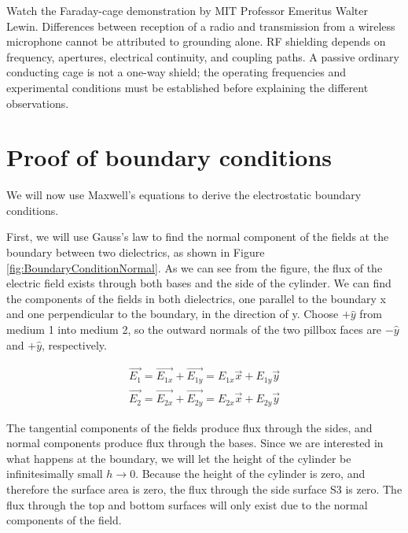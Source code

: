 \documentclass{ximera}
\begin{document}
Watch the Faraday-cage demonstration by MIT Professor Emeritus Walter Lewin. Differences between reception of a radio and transmission from a wireless microphone cannot be attributed to grounding alone. RF shielding depends on frequency, apertures, electrical continuity, and coupling paths. A passive ordinary conducting cage is not a one-way shield; the operating frequencies and experimental conditions must be established before explaining the different observations.


\begin{center}  
\end{center}

\section{Proof of boundary conditions}

We will now use Maxwell's equations to derive the electrostatic boundary conditions. 

First, we will use Gauss's law to find the normal component of the fields at the boundary between two dielectrics, as shown in Figure \ref{fig:BoundaryConditionNormal}. As we can see from the figure, the flux of the electric field exists through both bases and the side of the cylinder. We can find the components of the fields in both dielectrics, one parallel to the boundary x and one perpendicular to the boundary, in the direction of y. Choose $+\hat{y}$ from medium 1 into medium 2, so the outward normals of the two pillbox faces are $-\hat{y}$ and $+\hat{y}$, respectively.

\begin{eqnarray}
\vec{E_1}= \vec{E_{1x}}+\vec{E_{1y}}= E_{1x} \vec{x}+E_{1y} \vec{y} \\
\vec{E_2}= \vec{E_{2x}}+\vec{E_{2y}}= E_{2x} \vec{x}+E_{2y} \vec{y}
\end{eqnarray}


The tangential components of the fields produce flux through the sides, and normal components produce flux through the bases.  Since we are interested in what happens at the boundary, we will let the height of the cylinder be infinitesimally small $h \rightarrow 0$. Because the height of the cylinder is zero, and therefore the surface area is zero, the flux through the side surface S3 is zero. The flux through the top and bottom surfaces will only exist due to the normal components of the field.
\end{document}
